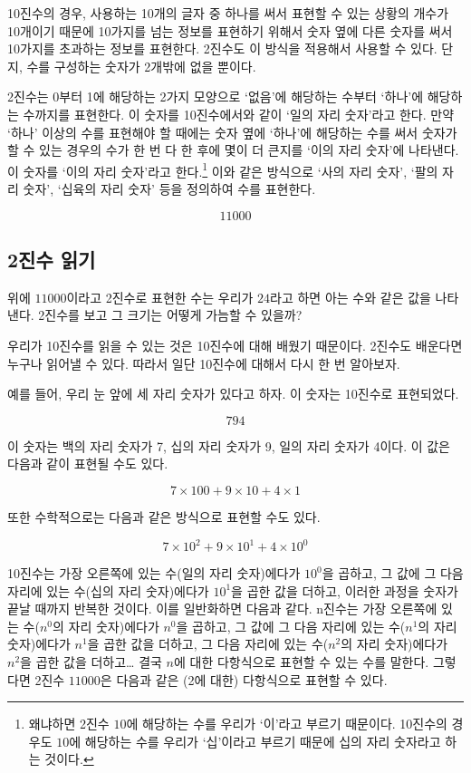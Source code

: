 \documentclass{article}
\begin{document}
10진수의 경우, 사용하는 10개의 글자 중 하나를 써서 표현할 수 있는 상황의 개수가
10개이기 때문에 10가지를 넘는 정보를 표현하기 위해서 숫자 옆에 다른 숫자를 써서
10가지를 초과하는 정보를 표현한다. 2진수도 이 방식을 적용해서 사용할 수 있다.
단지, 수를 구성하는 숫자가 2개밖에 없을 뿐이다.

2진수는 0부터 1에 해당하는 2가지 모양으로 `없음'에 해당하는 수부터 `하나'에
해당하는 수까지를 표현한다. 이 숫자를 10진수에서와 같이 `일의 자리 숫자'라고 한다.
만약 `하나' 이상의 수를 표현해야 할 때에는 숫자 옆에 `하나'에 해당하는 수를 써서
숫자가 할 수 있는 경우의 수가 한 번 다 한 후에 몇이 더 큰지를 `이의 자리 숫자'에
나타낸다. 이 숫자를 `이의 자리 숫자'라고 한다.\footnote{왜냐하면 2진수 $10$에
해당하는 수를 우리가 `이'라고 부르기 때문이다. 10진수의 경우도 $10$에 해당하는
수를 우리가 `십'이라고 부르기 때문에 십의 자리 숫자라고 하는 것이다.}
이와 같은 방식으로 `사의 자리 숫자', `팔의 자리 숫자', `십육의 자리 숫자' 등을
정의하여 수를 표현한다.

$$
11000
$$

\subsection{2진수 읽기}

위에 $11000$이라고 2진수로 표현한 수는 우리가 $24$라고 하면 아는 수와 같은 값을
나타낸다. 2진수를 보고 그 크기는 어떻게 가늠할 수 있을까?

우리가 10진수를 읽을 수 있는 것은 10진수에 대해 배웠기 때문이다. 2진수도 배운다면
누구나 읽어낼 수 있다. 따라서 일단 10진수에 대해서 다시 한 번 알아보자.

예를 들어, 우리 눈 앞에 세 자리 숫자가 있다고 하자. 이 숫자는 10진수로 표현되었다.

$$
794
$$

이 숫자는 백의 자리 숫자가 7, 십의 자리 숫자가 9, 일의 자리 숫자가 4이다.
이 값은 다음과 같이 표현될 수도 있다.

$$
7 \times 100 + 9 \times 10 + 4 \times 1
$$

또한 수학적으로는 다음과 같은 방식으로 표현할 수도 있다.

$$
7 \times 10^2 + 9 \times 10^1 + 4 \times 10^0
$$

10진수는 가장 오른쪽에 있는 수(일의 자리 숫자)에다가 $10^0$을 곱하고, 그 값에
그 다음 자리에 있는 수(십의 자리 숫자)에다가 $10^1$을 곱한 값을 더하고,
이러한 과정을 숫자가 끝날 때까지 반복한 것이다. 이를 일반화하면 다음과 같다.
n진수는 가장 오른쪽에 있는 수($n^0$의 자리 숫자)에다가 $n^0$을 곱하고, 그 값에
그 다음 자리에 있는 수($n^1$의 자리 숫자)에다가 $n^1$을 곱한 값을 더하고,
그 다음 자리에 있는 수($n^2$의 자리 숫자)에다가 $n^2$을 곱한 값을 더하고\dots
결국 $n$에 대한 다항식으로 표현할 수 있는 수를 말한다.
그렇다면 2진수 $11000$은 다음과 같은 (2에 대한) 다항식으로 표현할 수 있다.
\end{document}
